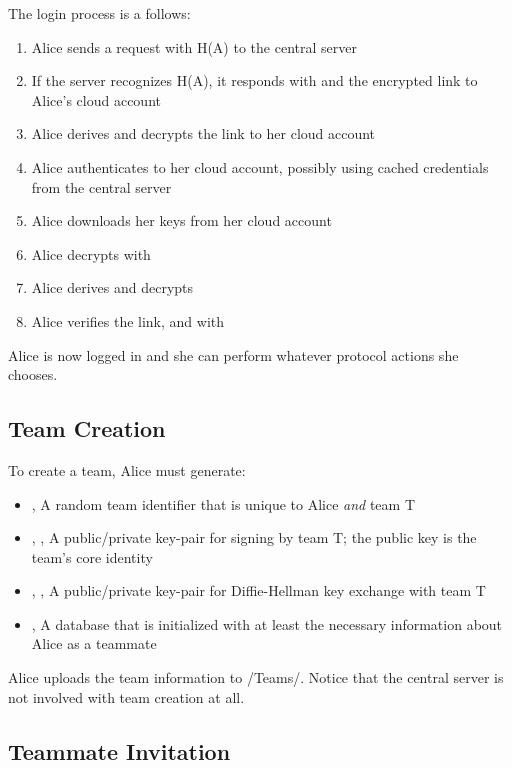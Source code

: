 \documentclass[pldi,10pt,preprint]{sigplanconf-pldi16}
\begin{document}
The login process is a follows:

\begin{enumerate}
\item Alice sends a request with H(A) to the central server
\item If the server recognizes H(A), it responds with  and the encrypted link to Alice's cloud account
\item Alice derives  and decrypts the link to her cloud account
\item Alice authenticates to her cloud account, possibly using cached credentials from the central server
\item Alice downloads her keys from her cloud account
\item Alice decrypts  with 
\item Alice derives  and decrypts 
\item Alice verifies the link,  and  with 
\end{enumerate}

Alice is now logged in and she can perform whatever protocol actions she chooses.

\subsection{Team Creation}

To create a team, Alice must generate:

\begin{itemize}
\item {}, A random team identifier that is unique to Alice \emph{and} team T
\item {}, , A public/private key-pair for signing by team T; the public key is the team's core identity
\item {}, , A public/private key-pair for Diffie-Hellman key exchange with team T
\item {}, A database that is initialized with at least the necessary information about Alice as a teammate
\end{itemize}

Alice uploads the team information to /Teams/.
Notice that the central server is not involved with team creation at all.

\subsection{Teammate Invitation}
\end{document}
